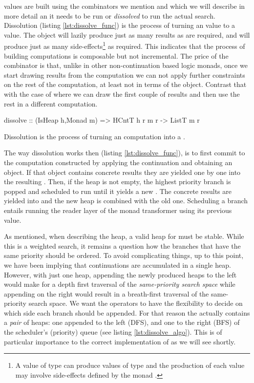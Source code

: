  values are built using the combinators we mention and which we will
describe in more detail an it needs to be run or \emph{dissolved} to run the actual
search. Dissolution (listing \ref{lst:dissolve_func}) is the process
of turning an  value to a  value. The
 object will lazily produce just as many results as are
required, and will produce just as many side-effects\footnote{A value of type  can produce values of type  and the production of each value may involve side-effects defined by the monad .} as required.
This indicates that the process of building computations is
composable but not incremental. The price of the \hask{<//>}
combinator is that, unlike in other non-continuation
based logic  monads, once we start drawing results from the computation we can
not apply further constraints on the rest of the computation, at least not
in terms of the  object.  Contrast that with the case of
 where we can draw the first couple of results and then
use the rest in a different computation.

\begin{code}
\begin{haskellcode}
dissolve :: (IsHeap h,Monad m) => HCntT h r m r -> ListT m r
\end{haskellcode}
  \caption{\label{lst:dissolve_func}Dissolution is the process of
    turning an  computation into a .}
\end{code}

The way dissolution works then (listing \ref{lst:dissolve_func}), is to first
commit to the computation constructed by applying the continuation and
obtaining an  object. If that object contains concrete results they are
yielded one by one into the resulting .
Then, if the heap is not empty, the highest priority branch is popped and scheduled to run until it yields
a new . The concrete results are yielded into  and the
new heap is combined with the old one. Scheduling a branch entails
running the reader layer of the monad transformer using its previous
value.

As mentioned, when describing the heap, a valid heap for 
must be stable. While this is a weighted search, it remains a question
how the branches that have the same priority should be ordered.  To
avoid complicating things, up to this point, we have been implying that
continuations are accumulated in a single heap. However, with just one
heap, appending the newly produced heaps to the left would make for a
depth first traversal of the \emph{same-priority search space} while
appending on the right would result in a breath-first traversal of the same-priority search space. We
want the operators to have the flexibility to decide on which side
each branch should be appended. For that reason the 
actually contains a \emph{pair} of heaps: one appended to the left (DFS), and one
to the right (BFS) of the scheduler's (priority) queue (see listing \ref{lst:dissolve_algo}).
This is of particular importance to the correct
implementation of \hask{<//>} as we will see shortly.

